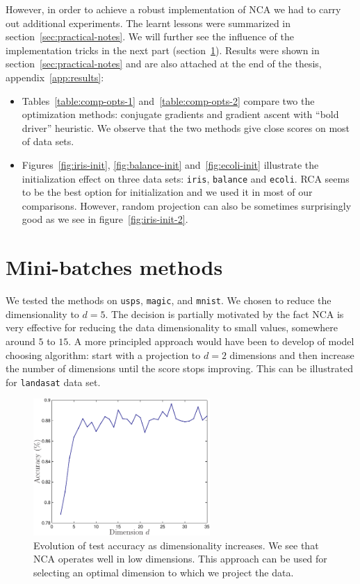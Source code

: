 However, in order to achieve a robust implementation of NCA we had to carry out additional experiments. The learnt lessons were summarized in section~\ref{sec:practical-notes}. We will further see the influence of the implementation tricks in the next part (section~\ref{sec:method-comparison}). Results were shown in section~\ref{sec:practical-notes} and are also attached at the end of the thesis, appendix~\ref{app:results}:
\begin{itemize}
 \item Tables~\ref{table:comp-opts-1} and~\ref{table:comp-opts-2} compare two the optimization methods: conjugate gradients and gradient ascent with ``bold driver'' heuristic. We observe that the two methods give close scores on most of data sets. 
 \item Figures~\ref{fig:iris-init}, \ref{fig:balance-init} and~\ref{fig:ecoli-init} illustrate the initialization effect on three data sets: \texttt{iris}, \texttt{balance} and \texttt{ecoli}. RCA seems to be the best option for initialization and we used it in most of our comparisons. However, random projection can also be sometimes surprisingly good as we see in figure~\ref{fig:iris-init-2}. 
\end{itemize}

\section{Mini-batches methods}
\label{sec:method-comparison}

  We tested the methods on \texttt{usps}, \texttt{magic}, and \texttt{mnist}. We chosen to reduce the dimensionality to $d=5$. The decision is partially motivated by the fact NCA is very effective for reducing the data dimensionality to small values, somewhere around $5$ to $15$. A more principled approach would have been to develop of model choosing algorithm: start with a projection to $d=2$ dimensions and then increase the number of dimensions until the score stops improving. This can be illustrated for \texttt{landasat} data set.

  \begin{figure}
   \centering\includegraphics[width=0.6\textwidth]{images/landsat-evolution}
   \caption{Evolution of test accuracy as dimensionality increases. We see that NCA operates well in low dimensions. This approach can be used for selecting an optimal dimension to which we project the data.}
   \label{fig:landsat-evolution}
  \end{figure}


